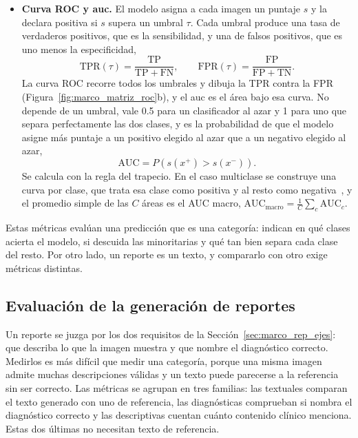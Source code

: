 \begin{itemize}
    \item \textbf{Curva ROC y \gls{auc}.} El modelo asigna a cada imagen un puntaje $s$ y la declara positiva si
    $s$ supera un umbral $\tau$. Cada umbral produce una tasa de verdaderos positivos, que es la sensibilidad, y
    una de falsos positivos, que es uno menos la especificidad,
    \begin{equation}
        \mathrm{TPR}(\tau) = \frac{\mathrm{TP}}{\mathrm{TP} + \mathrm{FN}}, \qquad
        \mathrm{FPR}(\tau) = \frac{\mathrm{FP}}{\mathrm{FP} + \mathrm{TN}}.
        \label{eq:marco_tpr_fpr}
    \end{equation}
    La curva ROC recorre todos los umbrales y dibuja la TPR contra la FPR (Figura~\ref{fig:marco_matriz_roc}b),
    y el \gls{auc} es el área bajo esa curva. No depende de un umbral, vale 0.5 para un clasificador al azar y 1
    para uno que separa perfectamente las dos clases, y es la probabilidad de que el modelo asigne más puntaje a
    un positivo elegido al azar que a un negativo elegido al azar,
    \begin{equation}
        \mathrm{AUC} = P\!\left(s(x^{+}) > s(x^{-})\right).
        \label{eq:marco_auc}
    \end{equation}
    Se calcula con la regla del trapecio. En el caso multiclase se construye una curva por clase, que trata esa
    clase como positiva y al resto como negativa~\cite{fawcett2006introduction}, y el promedio simple de las $C$
    áreas es el AUC macro, $\mathrm{AUC}_{\text{macro}} = \frac{1}{C}\sum_{c} \mathrm{AUC}_c$.
\end{itemize}

Estas métricas evalúan una predicción que es una categoría: indican en qué clases acierta el modelo, si
descuida las minoritarias y qué tan bien separa cada clase del resto. Por otro lado, un reporte es un texto, y
compararlo con otro exige métricas distintas.

\subsection{Evaluación de la generación de reportes}
\label{sec:marco_eval_texto}

Un reporte se juzga por los dos requisitos de la Sección~\ref{sec:marco_rep_ejes}: que describa lo que la imagen
muestra y que nombre el diagnóstico correcto. Medirlos es más difícil que medir una categoría, porque una misma
imagen admite muchas descripciones válidas y un texto puede parecerse a la referencia sin ser correcto. Las
métricas se agrupan en tres familias: las textuales comparan el texto
generado con uno de referencia, las diagnósticas comprueban si nombra el diagnóstico correcto y las descriptivas
cuentan cuánto contenido clínico menciona. Estas dos últimas no necesitan texto de referencia.

